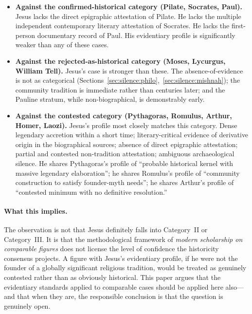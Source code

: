 \documentclass[12pt,oneside]{article}
\begin{document}
\begin{itemize}[leftmargin=2em]
\item \textbf{Against the confirmed-historical category (Pilate,
  Socrates, Paul).}  Jesus lacks the direct epigraphic attestation
  of Pilate.  He lacks the multiple independent contemporary
  literary attestation of Socrates.  He lacks the first-person
  documentary record of Paul.  His evidentiary profile is
  significantly weaker than any of these cases.
\item \textbf{Against the rejected-as-historical category (Moses,
  Lycurgus, William Tell).}  Jesus's case is stronger than
  these.  The absence-of-evidence is not as categorical
  (Sections~\ref{sec:silence:philo},~\ref{sec:silence:mishnah});
  the community tradition is immediate rather than centuries
  later; and the Pauline stratum, while non-biographical, is
  demonstrably early.
\item \textbf{Against the contested category (Pythagoras, Romulus,
  Arthur, Homer, Laozi).}  Jesus's profile most closely matches
  this category.  Dense legendary accretion within a short time;
  literary-critical evidence of derivative origin in the
  biographical sources; absence of direct epigraphic attestation;
  partial and contested non-tradition attestation; ambiguous
  archaeological silence.  He shares Pythagoras's profile of
  ``probable historical kernel with massive legendary
  elaboration''; he shares Romulus's profile of ``community
  construction to satisfy founder-myth needs''; he shares
  Arthur's profile of ``contested minimum with no definitive
  resolution.''
\end{itemize}

\paragraph{What this implies.}
The observation is not that Jesus definitely falls into Category~II
or Category~III.  It is that the methodological framework of
\textit{modern scholarship on comparable figures} does not license
the level of confidence the historicity consensus projects.  A
figure with Jesus's evidentiary profile, if he were not the founder
of a globally significant religious tradition, would be treated as
genuinely contested rather than as obviously historical.  This paper
argues that the evidentiary standards applied to comparable cases
should be applied here also---and that when they are, the
responsible conclusion is that the question is genuinely open.
\end{document}
